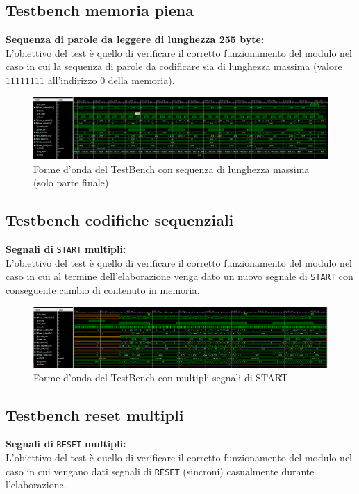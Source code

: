 \documentclass{article}
\begin{document}
\subsection{Testbench memoria piena}
\textbf{Sequenza di parole da leggere di lunghezza 255 byte:}\\
L'obiettivo del test è quello di verificare il corretto funzionamento del modulo nel caso in cui la sequenza di parole da codificare sia di lunghezza massima (valore $11111111$ all'indirizzo $0$ della memoria).

\begin{figure}[H]
\centerline{\includegraphics[scale=0.35]{tb_seq_max.PNG}}
\centering
\caption{Forme d'onda del TestBench con sequenza di lunghezza massima (solo parte finale)}
\centering
\end{figure}

\subsection{Testbench codifiche sequenziali}
\textbf{Segnali di} \verb|START| \textbf{multipli:}\\
L'obiettivo del test è quello di verificare il corretto funzionamento del modulo nel caso in cui al termine dell'elaborazione venga dato un nuovo segnale di \verb|START| con conseguente cambio di contenuto in memoria.

\begin{figure}[H]
\centerline{\includegraphics[scale=0.35]{tb_start_multipli.PNG}}
\centering
\caption{Forme d'onda del TestBench con multipli segnali di START}
\centering
\end{figure}

\subsection{Testbench reset multipli}
\textbf{Segnali di} \verb|RESET| \textbf{multipli:}\\
L'obiettivo del test è quello di verificare il corretto funzionamento del modulo nel caso in cui vengano dati segnali di \verb|RESET| (sincroni) casualmente durante l'elaborazione.
\end{document}
